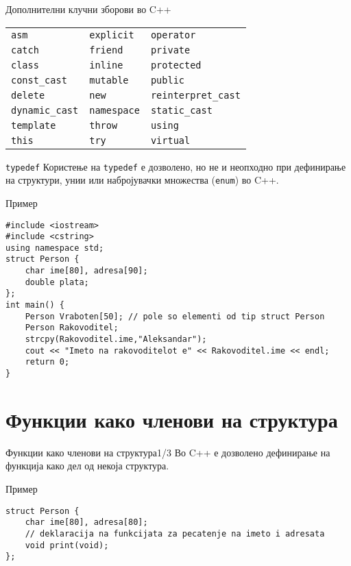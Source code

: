 \begin{frame}{Дополнителни клучни зборови во C++}
\begin{center}
    \begin{tabular}{l l l}
        \texttt{asm} & \texttt{explicit} & \texttt{operator}  \\
        \texttt{catch} & \texttt{friend} & \texttt{private} \\
        \texttt{class} & \texttt{inline} & \texttt{protected} \\ 
        \texttt{const\_cast} & \texttt{mutable} & \texttt{public} \\ 
        \texttt{delete} & \texttt{new} & \texttt{reinterpret\_cast} \\
        \texttt{dynamic\_cast} & \texttt{namespace} & \texttt{static\_cast} \\ 
        \texttt{template} & \texttt{throw} & \texttt{using} \\
        \texttt{this} & \texttt{try} & \texttt{virtual}
    \end{tabular}
\end{center}    
\end{frame}

\begin{frame}[fragile]{\texttt{typedef}}
Користење на \texttt{typedef} е дозволено, но не и неопходно при дефинирање на структури,
унии или набројувачки множества (\texttt{enum}) во C++.
\begin{exampleblock}{Пример}
\begin{lstlisting}
#include <iostream>
#include <cstring>
using namespace std;
struct Person {
    char ime[80], adresa[90];
    double plata;
};
int main() {
    Person Vraboten[50]; // pole so elementi od tip struct Person
    Person Rakovoditel;
    strcpy(Rakovoditel.ime,"Aleksandar");
    cout << "Imeto na rakovoditelot e" << Rakovoditel.ime << endl;
    return 0;
}
\end{lstlisting}
\end{exampleblock}
\end{frame}

\section{Функции како членови на структура}

\begin{frame}[fragile]{Функции како членови на структура}{1/3}
Во C++ е дозволено дефинирање на функција како дел од некоја структура.
\begin{exampleblock}{Пример}
\begin{lstlisting}
struct Person {
    char ime[80], adresa[80];
    // deklaracija na funkcijata za pecatenje na imeto i adresata
    void print(void);
};
\end{lstlisting}
\end{exampleblock}
\end{frame}

